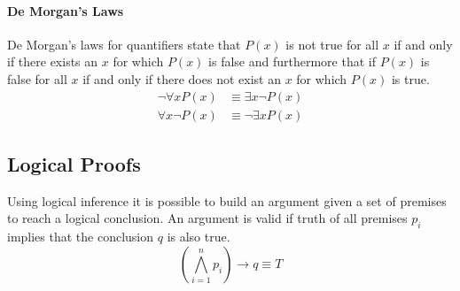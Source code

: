 \documentclass[a4paper, 10pt]{article}
\begin{document}
\paragraph{De Morgan's Laws}
De Morgan's laws for quantifiers state that \(P(x)\) is not true for all \(x\) if and only if there exists an \(x\) for which \(P(x)\) is false and furthermore that if \(P(x)\) is false for all \(x\) if and only if there does not exist an \(x\) for which \(P(x)\) is true.
\begin{align*}
    \neg\forall x P(x) &\equiv \exists x\neg P(x)\\
    \forall x\neg P(x) &\equiv \neg\exists x P(x)
\end{align*}

\newpage
\subsection{Logical Proofs}
Using logical inference it is possible to build an argument given a set of premises to reach a logical conclusion. An argument is valid if truth of all premises \(p_i\) implies that the conclusion \(q\) is also true.
\[\left(\bigwedge_{i=1}^n p_i\right)\rightarrow q \equiv T\]
\end{document}
